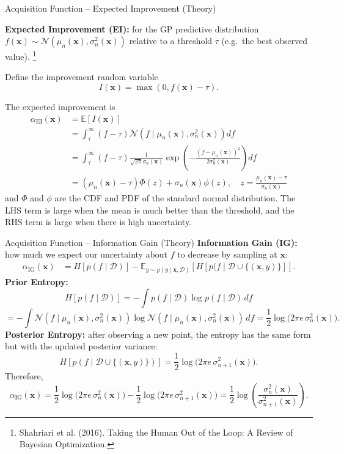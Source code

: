 \documentclass[9pt]{beamer}
\begin{document}
\begin{frame}{Acquisition Function -- Expected Improvement (Theory)}

	\textbf{Expected Improvement (EI):} for the GP predictive distribution 
	$f(\mathbf{x}) \sim \mathcal{N}(\mu_n(\mathbf{x}), \sigma_n^2(\mathbf{x}))$
	relative to a threshold $\tau$ (e.g.\ the best observed value).
	\footnote{
	\tiny
	Shahriari et al. (2016). Taking the Human Out of the Loop: A Review of Bayesian Optimization.
	}
	
	Define the improvement random variable
	\[
	I(\mathbf{x}) = \max(0, f(\mathbf{x}) - \tau).
	\]
	
	The expected improvement is
	\begin{align*}
	\alpha_{\mathrm{EI}}(\mathbf{x})
	&= \mathbb{E}[I(\mathbf{x})] \\
	&= \int_\tau^\infty (f - \tau) \mathcal{N}(f \mid \mu_n(\mathbf{x}), \sigma_n^2(\mathbf{x})) df \\
	&= \int_\tau^\infty (f - \tau) \frac{1}{\sqrt{2\pi}\sigma_n(\mathbf{x})} \exp\!\left(-\frac{(f - \mu_n(\mathbf{x}))^2}{2\sigma_n^2(\mathbf{x})}\right) df \\
	&= (\mu_n(\mathbf{x}) - \tau) \Phi(z) + \sigma_n(\mathbf{x}) \phi(z),\quad
	z = \frac{\mu_n(\mathbf{x}) - \tau}{\sigma_n(\mathbf{x})}
	\end{align*}
	and $\Phi$ and $\phi$ are the CDF and PDF of the standard normal distribution.	The LHS term is large when the mean is much better than the threshold, and the RHS term is large when there is high uncertainty.
\end{frame}
\begin{frame}{Acquisition Function -- Information Gain (Theory)}
	\textbf{Information Gain (IG):} how much we expect our uncertainty about $f$ to decrease by sampling at $\mathbf{x}$:
	\begin{align*}
		\alpha_{\mathrm{IG}}(\mathbf{x})
		&= H\!\left[p(f \mid \mathcal{D})\right] - \mathbb{E}_{y \sim p(y \mid \mathbf{x}, \mathcal{D})}\!\left[H\!\left[p(f \mid \mathcal{D} \cup \{(\mathbf{x}, y)\}\right]\right].
	\end{align*}
	\textbf{Prior Entropy:} 
	\[
		H\!\left[p(f \mid \mathcal{D})\right] = -\int p(f \mid \mathcal{D}) \log p(f \mid \mathcal{D}) \, df
	\]
	\[
		= -\int \mathcal{N}(f \mid \mu_n(\mathbf{x}), \sigma_n^2(\mathbf{x}))
		\log \mathcal{N}(f \mid \mu_n(\mathbf{x}), \sigma_n^2(\mathbf{x})) \, df
		= \frac{1}{2} \log\!\bigl(2\pi e\,\sigma_n^2(\mathbf{x})\bigr).
	\]
	\textbf{Posterior Entropy:} after observing a new point, the entropy has the same form but with the updated posterior variance:
	\[
		H\!\left[p(f \mid \mathcal{D} \cup \{(\mathbf{x}, y)\})\right]
		= \frac{1}{2} \log\!\bigl(2\pi e\,\sigma_{n+1}^2(\mathbf{x})\bigr).
	\]
	Therefore,
	\[
		\alpha_{\mathrm{IG}}(\mathbf{x})
		= \frac{1}{2}\log\!\bigl(2\pi e\,\sigma_n^2(\mathbf{x})\bigr)
		- \frac{1}{2}\log\!\bigl(2\pi e\,\sigma_{n+1}^2(\mathbf{x})\bigr)
		= \frac{1}{2}\log\!\left(\frac{\sigma_n^2(\mathbf{x})}{\sigma_{n+1}^2(\mathbf{x})}\right).
	\]
\end{frame}
\end{document}
